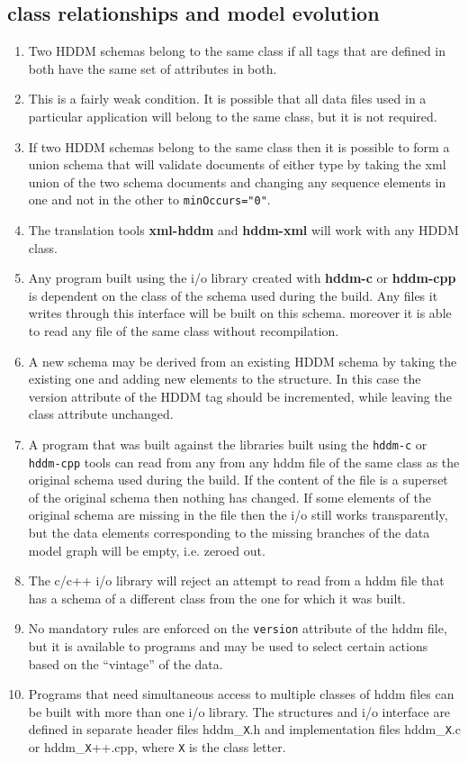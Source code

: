 \documentclass{revtex4}
\begin{document}
\subsection{class relationships and model evolution}
\begin{enumerate}
\item  Two HDDM schemas belong to the same class if all tags
that are defined in both have the same set of attributes in both. 
\item  This is a fairly weak condition. It is possible that all
data files used in a particular application will belong to the
same class, but it is not required. 
\item  If two HDDM schemas belong to the same class then it is
possible to form a union schema that will validate documents of
either type by taking the xml union of the two schema documents
and changing any sequence elements in one and not in the other
to \texttt{minOccurs="0"}. 
\item  The translation tools \textbf{xml-hddm} and \textbf{hddm-xml}
will work with any HDDM class. 
\item  Any program built using the i/o library created with \textbf{hddm-c}
or \textbf{hddm-cpp} is dependent on the class of the schema used
during the build. Any files it writes through this interface will
be built on this schema. moreover it is able to read any file
of the same class without recompilation. 
\item  A new schema may be derived from an existing HDDM schema
by taking the existing one and adding new elements to the
structure. In this case the version attribute of the HDDM tag
should be incremented, while leaving the class attribute unchanged. 
\item  A program that was built against the libraries built using the
\texttt{hddm-c} or \texttt{hddm-cpp} tools can read from any from any
hddm file of the same class as the original schema used during the
build. If the content of the file is a superset of the original schema
then nothing has changed. If some elements of the original schema are
missing in the file then the i/o still works transparently, but the
data elements corresponding to the missing branches of the data model
graph will be empty, i.e. zeroed out. 
\item  The c/c++ i/o library will reject an attempt to read from a
hddm file that has a schema of a different class from the one for
which it was built. 
\item  No mandatory rules are enforced on the \texttt{version}
attribute of the hddm file, but it is available to programs and may
be used to select certain actions based on the ``vintage'' of the data. 
\item  Programs that need simultaneous access to multiple classes
of hddm files can be built with more than one i/o library. The
structures and i/o interface are defined in separate header files
hddm\_\texttt{X}.h and implementation files hddm\_\texttt{X}.c
or hddm\_\texttt{X}++.cpp, where \texttt{X} is the class letter. 

\end{enumerate}
\end{document}
